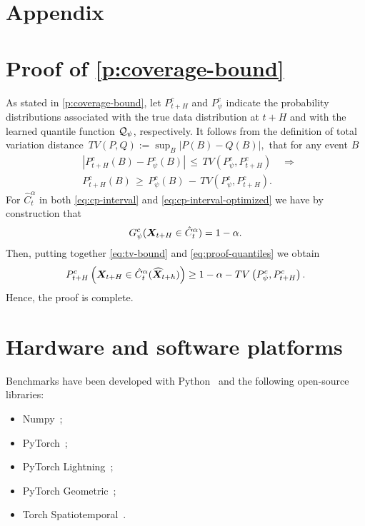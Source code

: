 \section*{Appendix}

\section{Proof of \autoref{p:coverage-bound}}\label{a:theory}

As stated in \autoref{p:coverage-bound}, let $P^{c}_{t+H}$ and $P^c_{\psi}$ indicate the probability distributions associated with the true data distribution at $t+H$ and with the learned quantile function ${\mathcal{Q}}_{\psi}$, respectively. It follows from the definition of total variation distance $\,{TV}(P,Q) := \sup_{B}|P(B)-Q(B)|,$ that for any event $B$
\begin{align}
    &|P^{c}_{t+H}(B)-P^c_{\psi}(B)|\,\le\,{{TV}}(P^c_{\psi},P^{c}_{t+H}) \quad \Longrightarrow \\
    &P^{c}_{t+H}(B)\,\ge\,P^c_{\psi}(B)\,-\,{{TV}}(P^c_{\psi},P^c_{t+H}).\label{eq:tv-bound}
\end{align}
For $ \hat C^{\alpha}_t$ in both \autoref{eq:cp-interval} and \autoref{eq:cp-interval-optimized} we have by construction that
\begin{equation}\label{eq:proof-quantiles}
    G^c_{\psi}({\bm{X}}_{t+H} \in \hat C^{\alpha}_t) = 1 - \alpha.
\end{equation}
Then, putting together \autoref{eq:tv-bound} and \autoref{eq:proof-quantiles} we obtain
\begin{align*}
    P^c_{t+H}\left({\bm{X}}_{t+H} \in \hat C^{\alpha}_t (\widehat {{\bm{X}}}_{t+h})\right) \geq 1 - \alpha - {TV}\left(P^c_{\psi}, P^c_{t+H}\right).
\end{align*}
Hence, the proof is complete.

\section{Hardware and software platforms}\label{a:exp}

Benchmarks have been developed with Python~\cite{rossum2009python} and the following open-source libraries:
\begin{itemize}
    \item Numpy~\cite{harris2020array};
    \item PyTorch~\cite{paske2019pytorch};
    \item PyTorch Lightning~\cite{Falcon_PyTorch_Lightning_2019};
    \item PyTorch Geometric~\cite{fey2019fast};
    \item Torch Spatiotemporal~\cite{Cini_Torch_Spatiotemporal_2022}.
\end{itemize}

